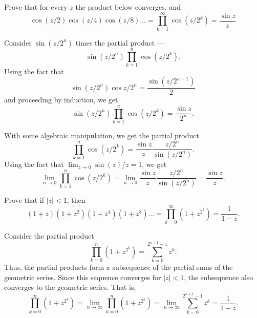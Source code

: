 \documentclass[12 pt, letterpaper]{hmcpset}
\begin{document}
\pagebreak

\begin{problem}[8.]
	Prove that for every $z$ the product below converges, and
	\[
		\cos{(z / 2)} \cos{(z / 4)} \cos{(z / 8)} \dots = \prod_{k = 1}^{\infty} \cos{(z / 2^{k})} = \frac{\sin{z}}{z}
	\]
\end{problem}

\begin{solution}
	Consider $\sin{(z/ 2^{n})}$ times the partial product ---
	\[
		\sin{(z/2^{n})} \prod_{k = 1}^{n} \cos{(z/2^{k})}.
	\]
	Using the fact that
	\[
		\sin{(z / 2^{n})} \cos{z / 2^{n}} = \frac{\sin{(z / 2^{n - 1})}}{2}
	\]
	and proceeding by induction, we get
	\[
		\sin{(z / 2^{n})} \prod_{k = 1}^{n} \cos{(z / 2^{k})} = \frac{\sin{z}}{2^{n}}.
	\]

	With some algebraic manipulation, we get the partial product
	\[
		\prod_{k = 1}^{n} \cos{(z / 2^{k})} = \frac{\sin{z}}{z} \frac{z / 2^{n}}{\sin{(z / 2^{n})}}.
	\]
	Using the fact that $\lim_{z \to 0} \sin (z) / z = 1$, we get
	\[
		\lim_{n \to 0} \prod_{k = 1}^{n} \cos{(z / 2^{k})} = \lim_{n \to 0} \frac{\sin{z}}{z} \frac{z/2^{n}}{\sin{(z / 2^{n})}} = \frac{\sin{z}}{z}.
	\]
\end{solution}

\pagebreak

\begin{problem}[9.]
	Prove that if $\lvert z \rvert < 1$, then
	\[
		(1 + z)(1 + z^{2})(1 + z^{4})(1 + z^{8}) \dots = \prod_{k = 0}^{\infty} (1 + z^{2^{k}}) = \frac{1}{1 - z}.
	\]
\end{problem}

\begin{solution}
	Consider the partial product
	\[
		\prod_{k = 0}^{n} (1 + z^{2^{k}}) = \sum_{k = 0}^{2^{n + 1} - 1} z^{k}.
	\]
	Thus, the partial products form a subsequence of the partial sums of the geometric series. Since this sequence converges for $\lvert z \rvert < 1$, the subsequence also converges to the geometric series. That is,
	\[
		\prod_{k = 0}^{\infty} (1 + z^{2^{k}}) = \lim_{n \to \infty} \prod_{k = 0}^{n} (1 + z^{2^{k}}) = \lim_{n \to \infty} \sum_{k = 0}^{2^{n + 1} - 1} z^{k} = \frac{1}{1 - z}.
	\]
\end{solution}
\end{document}
